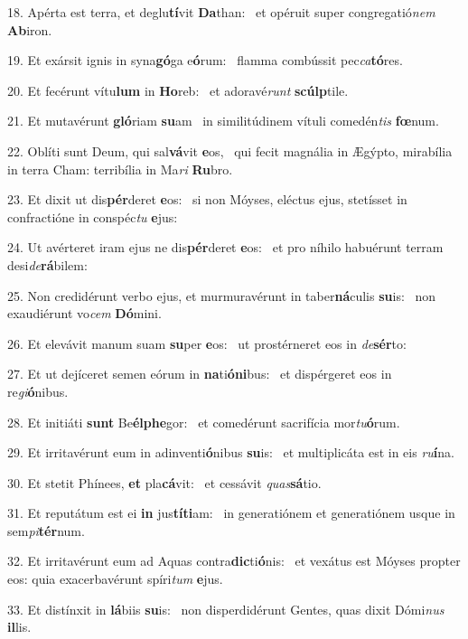 18. Apérta est terra, et deglu\textbf{tí}vit \textbf{Da}than: \ast\  et opéruit super congregatió\textit{nem} \textbf{Ab}iron.\

19. Et exársit ignis in syna\textbf{gó}ga e\textbf{ó}rum: \ast\  flamma combússit pec\textit{ca}\textbf{tó}res.\

20. Et fecérunt vítu\textbf{lum} in \textbf{Ho}reb: \ast\  et adoravé\textit{runt} \textbf{scúlp}tile.\

21. Et mutavérunt \textbf{gló}riam \textbf{su}am \ast\  in similitúdinem vítuli comedén\textit{tis} \textbf{fœ}num.\

22. Oblíti sunt Deum, qui sal\textbf{vá}vit \textbf{e}os, \ast\  qui fecit magnália in Ægýpto, mirabília in terra Cham: terribília in Ma\textit{ri} \textbf{Ru}bro.\

23. Et dixit ut dis\textbf{pér}deret \textbf{e}os: \ast\  si non Móyses, eléctus ejus, stetísset in confractióne in conspéc\textit{tu} \textbf{e}jus:\

24. Ut avérteret iram ejus ne dis\textbf{pér}deret \textbf{e}os: \ast\  et pro níhilo habuérunt terram desi\textit{de}\textbf{rá}bilem:\

25. Non credidérunt verbo ejus, et murmuravérunt in taber\textbf{ná}culis \textbf{su}is: \ast\  non exaudiérunt vo\textit{cem} \textbf{Dó}mini.\

26. Et elevávit manum suam \textbf{su}per \textbf{e}os: \ast\  ut prostérneret eos in \textit{de}\textbf{sér}to:\

27. Et ut dejíceret semen eórum in \textbf{na}ti\textbf{ó}\textbf{ni}bus: \ast\  et dispérgeret eos in re\textit{gi}\textbf{ó}nibus.\

28. Et initiáti \textbf{sunt} Be\textbf{él}\textbf{phe}gor: \ast\  et comedérunt sacrifícia mor\textit{tu}\textbf{ó}rum.\

29. Et irritavérunt eum in adinventi\textbf{ó}nibus \textbf{su}is: \ast\  et multiplicáta est in eis \textit{ru}\textbf{í}na.\

30. Et stetit Phínees, \textbf{et} pla\textbf{cá}vit: \ast\  et cessávit \textit{quas}\textbf{sá}tio.\

31. Et reputátum est ei \textbf{in} jus\textbf{tí}\textbf{ti}am: \ast\  in generatiónem et generatiónem usque in sem\textit{pi}\textbf{tér}num.\

32. Et irritavérunt eum ad Aquas contra\textbf{dic}ti\textbf{ó}nis: \ast\  et vexátus est Móyses propter eos: quia exacerbavérunt spíri\textit{tum} \textbf{e}jus.\

33. Et distínxit in \textbf{lá}biis \textbf{su}is: \ast\  non disperdidérunt Gentes, quas dixit Dómi\textit{nus} \textbf{il}lis.\

